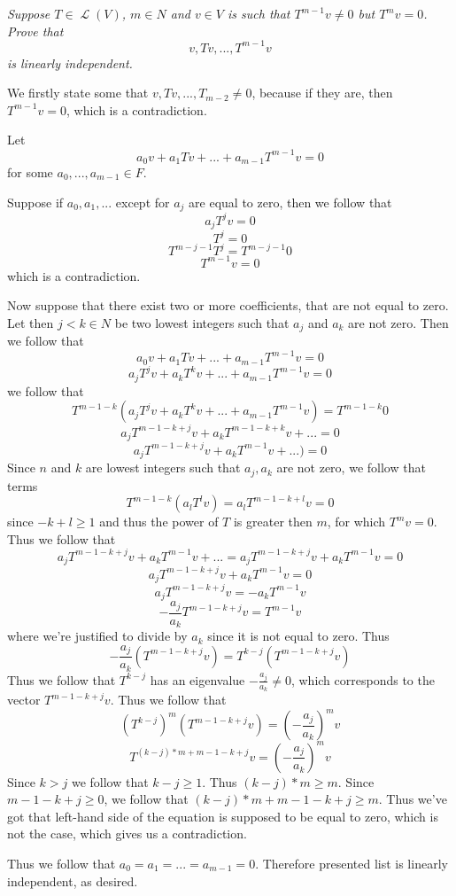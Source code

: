 \documentclass[11pt,oneside,titlepage]{book}
\DeclareMathOperator \map {\mathcal {L}}
\begin{document}
\textit{Suppose $T \in \map(V)$, $m \in N$ and $v \in V$ is such that
  $T^{m - 1}v \neq 0$ but $T^m v = 0$. Prove that
  $$v, Tv, ..., T^{m - 1}v$$
  is linearly independent.
}

We firstly state some that $v, Tv, ..., T_{m - 2} \neq 0$,
because if they are, then $T^{m - 1} v = 0$, which is a contradiction.

Let 
$$a_0 v + a_1 Tv + ... + a_{m - 1} T^{m - 1} v  = 0$$
for some $a_0, ..., a_{m - 1} \in F$.

Suppose if $a_0, a_1, ...$ except for $a_j$ are equal to zero, then we follow that
$$a_j T^jv  = 0$$
$$T^j = 0$$
$$T^{m - j - 1}T^j = T^{m - j - 1}0$$
$$T^{m - 1}v = 0$$
which is a contradiction.

Now suppose that there exist two or more coefficients, that are not equal to zero. 
Let then $j < k \in N$ be two lowest integers such that  $a_j$ and $a_k$ are not zero. Then
we follow that
$$a_0 v + a_1 Tv + ... + a_{m - 1} T^{m - 1} v  = 0$$
$$a_j T^j v + a_k T^k v  + ... + a_{m - 1} T^{m - 1} v  = 0$$
we follow that
$$T^{m - 1 - k}(a_j T^j v + a_k T^k v  + ... + a_{m - 1} T^{m - 1} v)  = T^{m - 1 - k}0$$
$$a_j T^{m - 1 - k + j} v + a_k T^{m - 1 - k + k} v  + ...   = 0$$
$$a_j T^{m - 1 - k + j} v + a_k T^{m - 1} v  + ... )  = 0$$
Since $n$ and $k$ are lowest integers such that $a_j, a_k$ are not zero, we follow that
terms
$$T^{m - 1 - k}(a_l T^l v) = a_l T^{m - 1 - k + l} v = 0$$
since $-k + l \geq 1$ and thus the power of $T$ is greater then $m$, for which $T^m v = 0$.
Thus we follow that
$$a_j T^{m - 1 - k + j} v + a_k T^{m - 1} v  + ... = a_j T^{m - 1 - k + j} v + a_k T^{m - 1} v = 0$$
$$a_j T^{m - 1 - k + j} v + a_k T^{m - 1} v = 0$$
$$a_j T^{m - 1 - k + j} v = - a_k T^{m - 1} v$$
$$- \frac{a_j}{a_k} T^{m - 1 - k + j} v = T^{m - 1} v$$
where we're justified to divide by $a_k$ since it is not equal to zero. Thus
$$- \frac{a_j}{a_k} (T^{m - 1 - k + j} v) = T^{k - j}( T^{m - 1 - k + j} v)$$
Thus we follow that $T^{k - j}$ has an eigenvalue $- \frac{a_j}{a_k} \neq 0$, which corresponds
to the vector $T^{m - 1 - k + j} v$. Thus we follow that
$$(T^{k - j})^m (T^{m - 1 - k + j} v) = (- \frac{a_j}{a_k})^m v$$
$$T^{(k - j) * m + m - 1 - k + j} v = (- \frac{a_j}{a_k})^m v$$
Since $k > j$ we follow that $k - j \geq 1$. Thus $(k - j)* m \geq m$. Since
$m - 1 - k + j \geq 0$, we follow that
$(k - j) * m + m - 1 - k + j \geq m$. Thus we've got that left-hand side of the
equation is supposed to be equal to zero, which is not the case, which gives us a
contradiction.

Thus we follow that $a_0 = a_1 = ... = a_{m - 1} = 0$. Therefore presented list
is linearly independent, as desired.
\end{document}
